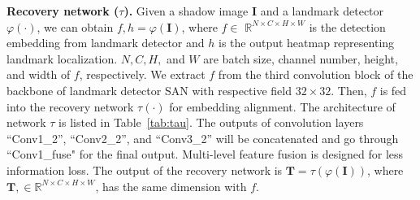 \documentclass[10pt,twocolumn,letterpaper]{article}
\newcommand{\tableref}[1]{Table~\ref{#1}}
\renewcommand{\paragraph}[1]{\vspace{1.25mm}\noindent\textbf{#1}}
\begin{document}
\paragraph{Recovery network ($\tau$).} Given a shadow image $\mathbf{I}$ and a landmark detector $\varphi(\cdot)$, we can obtain ${f}, {h} =\varphi({\mathbf{I}})$, where $f \in$ $\mathds{R}^{N\times C\times H\times W}$ is the detection embedding from landmark detector and $h$ is the output heatmap representing landmark localization. $N, C, H,$ and $W$ are batch size, channel number, height, and width of $f$, respectively. We extract $f$ from the third convolution block of the backbone of landmark detector SAN \cite{dong2018style} with respective field $32\times32$. Then, $f$ is fed into the recovery network $\tau(\cdot)$ for embedding alignment. The architecture of network $\tau$ is listed in \tableref{tab:tau}. The outputs of convolution layers ``Conv1\_2'', ``Conv2\_2'', and ``Conv3\_2'' will be concatenated and go through ``Conv1\_fuse" for the final output. Multi-level feature fusion is designed for less information loss. The output of the recovery network is $\mathbf{T}=\tau(\varphi(\mathbf{I}))$, where  $\mathbf{T}, \in \mathds{R}^{N\times C\times H\times W}$, has the same dimension with $f$.

\setcounter{table}{0}
\begin{table}[ht]
\caption{The architecture of recovery network.}
\centering
\footnotesize
{}
\end{table}
\end{document}
